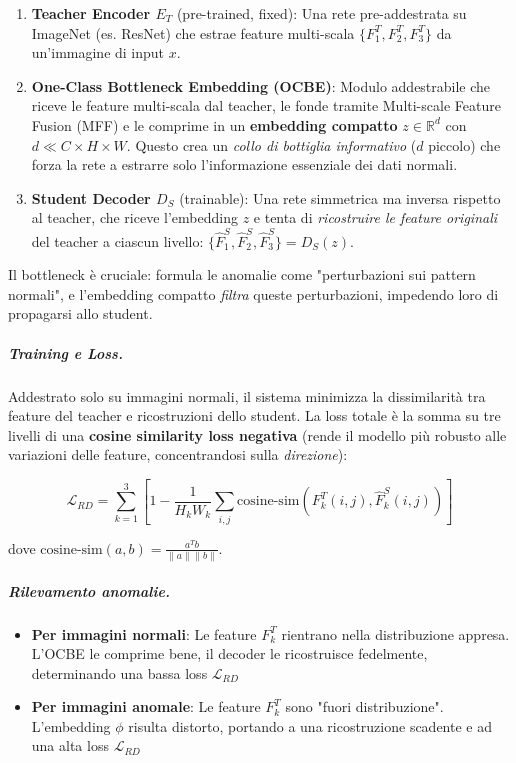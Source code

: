\begin{enumerate}
\item \textbf{Teacher Encoder $E_T$} (pre-trained, fixed): Una rete pre-addestrata su ImageNet (es. ResNet) che estrae feature multi-scala $\{F_1^T, F_2^T, F_3^T\}$ da un'immagine di input $x$.

\item \textbf{One-Class Bottleneck Embedding (OCBE)}: Modulo addestrabile che riceve le feature multi-scala dal teacher, le fonde tramite Multi-scale Feature Fusion (MFF) e le comprime in un \textbf{embedding compatto} $z \in \mathbb{R}^d$ con $d \ll C \times H \times W$. Questo crea un \textit{collo di bottiglia informativo} ($d$ piccolo) che forza la rete a estrarre solo l'informazione essenziale dei dati normali.

\item \textbf{Student Decoder $D_S$} (trainable): Una rete simmetrica ma inversa ris\-pet\-to al teacher, che riceve l'embedding $z$ e tenta di \textit{ricostruire le feature o\-ri\-gi\-na\-li} del teacher a ciascun livello: $\{\hat{F}_1^S, \hat{F}_2^S, \hat{F}_3^S\} = D_S(z)$.
\end{enumerate}

Il bottleneck è cruciale: formula le anomalie come "perturbazioni sui pattern normali", e l'embedding compatto \textit{filtra} queste perturbazioni, impedendo loro di propagarsi allo student.

\subparagraph{Training e Loss.}
Addestrato solo su immagini normali, il sistema minimizza la dissimilarità tra feature del teacher e ricostruzioni dello student. La loss totale è la somma su tre livelli di una \textbf{cosine similarity loss negativa} (rende il modello più robusto alle variazioni delle feature, concentrandosi sulla \textit{direzione}):

\begin{equation}
\mathcal{L}_{RD} = \sum_{k=1}^{3} \left[ 1 - \frac{1}{H_k W_k} \sum_{i,j} \text{cosine-sim}\left(F_k^T(i,j), \hat{F}_k^S(i,j)\right) \right]
\end{equation}

dove $\text{cosine-sim}(a,b) = \frac{a^T b}{\|a\|\|b\|}$. 


\subparagraph{Rilevamento anomalie.}
\begin{itemize}
\item \textbf{Per immagini normali}: Le feature $F_k^T$ rientrano nella distribuzione appresa. L'OCBE le comprime bene, il decoder le ricostruisce fedelmente, determinando una bassa loss $\mathcal{L}_{RD}$

\item \textbf{Per immagini anomale}: Le feature $F_k^T$ sono "fuori distribuzione". L'embedding $\phi$ risulta distorto, portando a una ricostruzione scadente e ad una alta loss $\mathcal{L}_{RD}$
\end{itemize}

